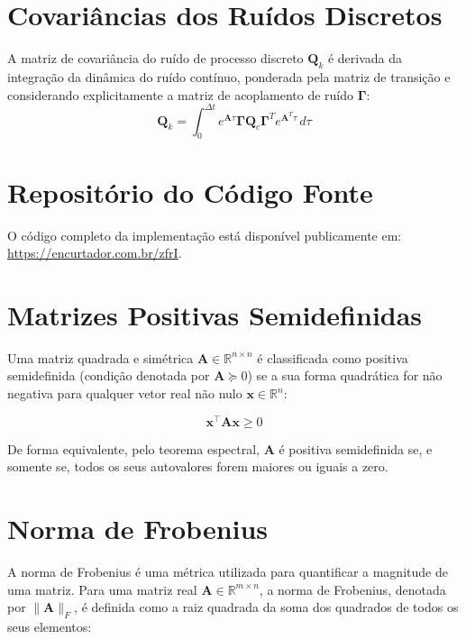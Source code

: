 \documentclass[journal]{IEEEtran}
\begin{document}
\begin{appendices}
\section{Covariâncias dos Ruídos Discretos}

A matriz de covariância do ruído de processo discreto $\mathbf{Q}_k$ é derivada da integração da dinâmica do ruído contínuo, ponderada pela matriz de transição e considerando explicitamente a matriz de acoplamento de ruído $\mathbf{\Gamma}$:
\begin{equation}
\mathbf{Q}_k = \int_{0}^{\Delta t} e^{\mathbf{A} \tau} \mathbf{\Gamma} \mathbf{Q}_c \mathbf{\Gamma}^T e^{\mathbf{A}^T \tau} \, d\tau
\end{equation}

\section{Repositório do Código Fonte}
\label{app:code}
O código completo da implementação está disponível publicamente em: \\
\url{https://encurtador.com.br/zfrI}.

\section{Matrizes Positivas Semidefinidas}
\label{app:PSD}

Uma matriz quadrada e simétrica $\mathbf{A} \in \mathbb{R}^{n \times n}$ é classificada como positiva semidefinida (condição denotada por $\mathbf{A} \succeq 0$) se a sua forma quadrática for não negativa para qualquer vetor real não nulo $\mathbf{x} \in \mathbb{R}^n$:

\begin{equation}
    \label{eq:psd_def}
    \mathbf{x}^\top \mathbf{A} \mathbf{x} \ge 0
\end{equation}

De forma equivalente, pelo teorema espectral, $\mathbf{A}$ é positiva semidefinida se, e somente se, todos os seus autovalores forem maiores ou iguais a zero. 

\section{Norma de Frobenius}
\label{app:frobenius}

A norma de Frobenius é uma métrica utilizada para quantificar a magnitude de uma matriz. Para uma matriz real $\mathbf{A} \in \mathbb{R}^{m \times n}$, a norma de Frobenius, denotada por $\|\mathbf{A}\|_F$, é definida como a raiz quadrada da soma dos quadrados de todos os seus elementos:


\end{appendices}
\end{document}
